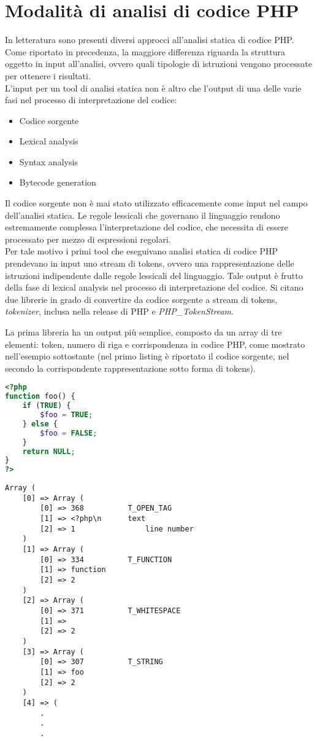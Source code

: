 \section{Modalità di analisi di codice PHP}
In letteratura sono presenti diversi approcci all'analisi statica di codice PHP. Come riportato in precedenza, la maggiore differenza riguarda la struttura oggetto in input all'analisi, ovvero quali tipologie di istruzioni vengono processate per ottenere i risultati.\\
L'input per un tool di analisi statica non è altro che l'output di una delle varie fasi nel processo di interpretazione del codice:
\begin{itemize}
\item Codice sorgente
\item Lexical analysis
\item Syntax analysis
\item Bytecode generation
\end{itemize}
Il codice sorgente non è mai stato utilizzato efficacemente come input nel campo dell'analisi statica. Le regole lessicali che governano il linguaggio rendono estremamente complessa l'interpretazione del codice, che necessita di essere processato per mezzo di espressioni regolari.\\
Per tale motivo i primi tool che eseguivano analisi statica di codice PHP prendevano in input uno stream di tokens, ovvero una rappresentazione delle istruzioni indipendente dalle regole lessicali del linguaggio. Tale output è frutto della fase di lexical analysis nel processo di interpretazione del codice.
Si citano due librerie in grado di convertire da codice sorgente a stream di tokens, \emph{tokenizer}\cite{tokenizer}, inclusa nella release di PHP e \emph{PHP\_TokenStream}\cite{tokenstream}.

La prima libreria ha un output più semplice, composto da un array di tre elementi: token, numero di riga e corrispondenza in codice PHP, come mostrato nell'esempio sottostante (nel primo listing è riportato il codice sorgente, nel secondo la corrispondente rappresentazione sotto forma di tokens). \\

\begin{lstlisting}[language=PHP]
<?php 
function foo() {
	if (TRUE) { 
		$foo = TRUE;
	} else {
		$foo = FALSE;
	}
	return NULL;
}
?>
\end{lstlisting}

\begin{lstlisting}
Array (
	[0] => Array (
		[0] => 368			T_OPEN_TAG
		[1] => <?php\n		text 
		[2] => 1				line number
	)
	[1] => Array (
		[0] => 334			T_FUNCTION
		[1] => function 
		[2] => 2
	)
	[2] => Array (
		[0] => 371			T_WHITESPACE 
		[1] => 
		[2] => 2
	)
	[3] => Array (
		[0] => 307			T_STRING 
		[1] => foo 
		[2] => 2
	)
	[4] => ( 
		.
		.
		.
\end{lstlisting}

